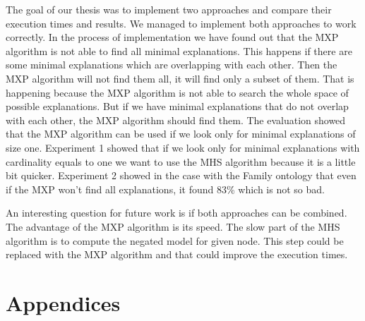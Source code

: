\documentclass[12pt,a4paper]{article}
\begin{document}
The goal of our thesis was to implement two approaches and compare their execution times and results. We managed to implement both approaches to work correctly. In the process of implementation we have found out that the MXP algorithm is not able to find all minimal explanations. This happens if there are some minimal explanations which are overlapping with each other. Then the MXP algorithm will not find them all, it will find only a subset of them. That is happening because the MXP algorithm is not able to search the whole space of possible explanations. But if we have minimal explanations that do not overlap with each other, the MXP algorithm should find them. The evaluation showed that the MXP algorithm can be used if we look only for minimal explanations of size one. Experiment 1 showed that if we look only for minimal explanations with cardinality equals to one we want to use the MHS algorithm because it is a little bit quicker. Experiment 2 showed in the case with the Family ontology that even if the MXP won't find all explanations, it found 83\% which is not so bad. 

An interesting question for future work is if both approaches can be combined. The advantage of the MXP algorithm is its speed. The slow part of the MHS algorithm is to compute the negated model for given node. This step could be replaced with the MXP algorithm and that could improve the execution times.

\pagebreak



\pagebreak
\section*{Appendices}
\end{document}
